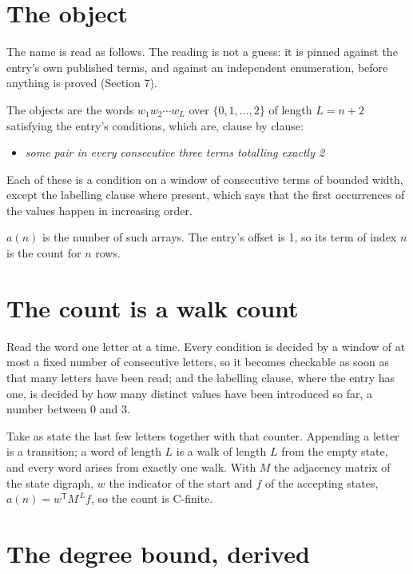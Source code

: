 \documentclass[11pt]{article}
\theoremstyle{definition}
\begin{document}
\section{The object}

The name is read as follows. The reading is not a guess: it is pinned against the entry's own published terms, and against an independent enumeration, before anything is proved (Section 7).

The objects are the words $w_1 w_2 \cdots w_L$ over $\{0,1,\dots,2\}$ of length $L = n + 2$ satisfying the entry's conditions, which are, clause by clause:

\begin{itemize}

\item {\itshape some pair in every consecutive three terms totalling exactly 2}

\end{itemize}

Each of these is a condition on a window of consecutive terms of bounded width, except the labelling clause where present, which says that the first occurrences of the values happen in increasing order.

$a(n)$ is the number of such arrays. The entry's offset is 1, so its term of index $n$ is the count for $n$ rows.

\section{The count is a walk count}

Read the word one letter at a time. Every condition is decided by a window of at most a fixed number of consecutive letters, so it becomes checkable as soon as that many letters have been read; and the labelling clause, where the entry has one, is decided by how many distinct values have been introduced so far, a number between $0$ and 3.

Take as state the last few letters together with that counter. Appending a letter is a transition; a word of length $L$ is a walk of length $L$ from the empty state, and every word arises from exactly one walk. With $M$ the adjacency matrix of the state digraph, $w$ the indicator of the start and $f$ of the accepting states, $a(n) = w^{\mathsf T}M^{\,L}f$, so the count is C-finite.

\section{The degree bound, derived}
\end{document}
